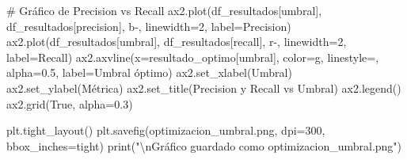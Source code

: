 \documentclass[
  doc,
  floatsintext,
  longtable,
  a4paper,
  nolmodern,
  notxfonts,
  notimes,
  12pt,
  colorlinks=true,linkcolor=blue,citecolor=blue,urlcolor=blue]{apa7}
\newenvironment{Shaded}{\begin{snugshade}}{\end{snugshade}}
\newcommand{\BuiltInTok}[1]{\textcolor[rgb]{0.00,0.23,0.31}{#1}}
\newcommand{\CharTok}[1]{\textcolor[rgb]{0.13,0.47,0.30}{#1}}
\newcommand{\CommentTok}[1]{\textcolor[rgb]{0.37,0.37,0.37}{#1}}
\newcommand{\DecValTok}[1]{\textcolor[rgb]{0.68,0.00,0.00}{#1}}
\newcommand{\FloatTok}[1]{\textcolor[rgb]{0.68,0.00,0.00}{#1}}
\newcommand{\NormalTok}[1]{\textcolor[rgb]{0.00,0.23,0.31}{#1}}
\newcommand{\OperatorTok}[1]{\textcolor[rgb]{0.37,0.37,0.37}{#1}}
\newcommand{\StringTok}[1]{\textcolor[rgb]{0.13,0.47,0.30}{#1}}
\newcommand{\VariableTok}[1]{\textcolor[rgb]{0.07,0.07,0.07}{#1}}
\begin{document}
\begin{Shaded}
\begin{Highlighting}[]
\CommentTok{\# Gráfico de Precision vs Recall}
\NormalTok{ax2.plot(df\_resultados[}\StringTok{\textquotesingle{}umbral\textquotesingle{}}\NormalTok{], df\_resultados[}\StringTok{\textquotesingle{}precision\textquotesingle{}}\NormalTok{], }\StringTok{\textquotesingle{}b{-}\textquotesingle{}}\NormalTok{, }
\NormalTok{         linewidth}\OperatorTok{=}\DecValTok{2}\NormalTok{, label}\OperatorTok{=}\StringTok{\textquotesingle{}Precision\textquotesingle{}}\NormalTok{)}
\NormalTok{ax2.plot(df\_resultados[}\StringTok{\textquotesingle{}umbral\textquotesingle{}}\NormalTok{], df\_resultados[}\StringTok{\textquotesingle{}recall\textquotesingle{}}\NormalTok{], }\StringTok{\textquotesingle{}r{-}\textquotesingle{}}\NormalTok{, }
\NormalTok{         linewidth}\OperatorTok{=}\DecValTok{2}\NormalTok{, label}\OperatorTok{=}\StringTok{\textquotesingle{}Recall\textquotesingle{}}\NormalTok{)}
\NormalTok{ax2.axvline(x}\OperatorTok{=}\NormalTok{resultado\_optimo[}\StringTok{\textquotesingle{}umbral\textquotesingle{}}\NormalTok{], color}\OperatorTok{=}\StringTok{\textquotesingle{}g\textquotesingle{}}\NormalTok{, linestyle}\OperatorTok{=}\StringTok{\textquotesingle{}{-}{-}\textquotesingle{}}\NormalTok{, alpha}\OperatorTok{=}\FloatTok{0.5}\NormalTok{,}
\NormalTok{            label}\OperatorTok{=}\StringTok{\textquotesingle{}Umbral óptimo\textquotesingle{}}\NormalTok{)}
\NormalTok{ax2.set\_xlabel(}\StringTok{\textquotesingle{}Umbral\textquotesingle{}}\NormalTok{)}
\NormalTok{ax2.set\_ylabel(}\StringTok{\textquotesingle{}Métrica\textquotesingle{}}\NormalTok{)}
\NormalTok{ax2.set\_title(}\StringTok{\textquotesingle{}Precision y Recall vs Umbral\textquotesingle{}}\NormalTok{)}
\NormalTok{ax2.legend()}
\NormalTok{ax2.grid(}\VariableTok{True}\NormalTok{, alpha}\OperatorTok{=}\FloatTok{0.3}\NormalTok{)}

\NormalTok{plt.tight\_layout()}
\NormalTok{plt.savefig(}\StringTok{\textquotesingle{}optimizacion\_umbral.png\textquotesingle{}}\NormalTok{, dpi}\OperatorTok{=}\DecValTok{300}\NormalTok{, bbox\_inches}\OperatorTok{=}\StringTok{\textquotesingle{}tight\textquotesingle{}}\NormalTok{)}
\BuiltInTok{print}\NormalTok{(}\StringTok{"}\CharTok{\textbackslash{}n}\StringTok{Gráfico guardado como \textquotesingle{}optimizacion\_umbral.png\textquotesingle{}"}\NormalTok{)}
\end{Highlighting}
\end{Shaded}
\end{document}
